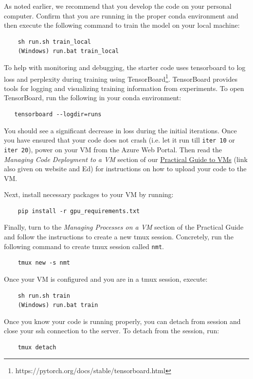 As noted earlier, we recommend that you develop the code on your personal computer. Confirm that you are running in the proper conda environment and then execute the following command to train the model on your local machine:

\begin{lstlisting}
    sh run.sh train_local
    (Windows) run.bat train_local
\end{lstlisting}

To help with monitoring and debugging, the starter code uses tensorboard to log loss and perplexity during training using TensorBoard\footnote{https://pytorch.org/docs/stable/tensorboard.html}. TensorBoard provides tools for logging and visualizing training information from experiments. To open TensorBoard, run the following in your conda environment:

\begin{lstlisting}
   tensorboard --logdir=runs
\end{lstlisting}

You should see a significant decrease in loss during the initial iterations. Once you have ensured that your code does not crash (i.e. let it run till \texttt{iter 10} or \texttt{iter 20}), power on your VM from the Azure Web Portal. Then read the \textit{Managing Code Deployment to a VM} section of our \href{https://docs.google.com/document/d/1jtANWXbIYXMZO_2X7jupauPxcEbz-TVJkdatg4gzOdk}{Practical Guide to VMs} (link also given on website and Ed) for instructions on how to upload your code to the VM.

Next, install necessary packages to your VM by running:

\begin{lstlisting}
    pip install -r gpu_requirements.txt
\end{lstlisting}

Finally, turn to the \textit{Managing Processes on a VM} section of the Practical Guide and follow the instructions to create a new tmux session. Concretely, run the following command to create tmux session called \texttt{nmt}.
\begin{lstlisting}
    tmux new -s nmt
\end{lstlisting}


Once your VM is configured and you are in a tmux session, execute:
\begin{lstlisting}
    sh run.sh train
    (Windows) run.bat train
\end{lstlisting}

Once you know your code is running properly, you can detach from session and close your ssh connection to the server. To detach from the session, run:
\begin{lstlisting}
    tmux detach
\end{lstlisting}

